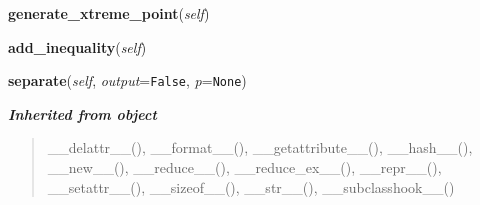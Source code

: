     \vspace{0.5ex}

\hspace{.8\funcindent}\begin{boxedminipage}{\funcwidth}

    \raggedright \textbf{generate\_xtreme\_point}(\textit{self})

\setlength{\parskip}{2ex}
\setlength{\parskip}{1ex}
    \end{boxedminipage}

    \label{coinor:cuppy:genericSeparation:GenericSeparation:add_inequality}

    \vspace{0.5ex}

\hspace{.8\funcindent}\begin{boxedminipage}{\funcwidth}

    \raggedright \textbf{add\_inequality}(\textit{self})

\setlength{\parskip}{2ex}
\setlength{\parskip}{1ex}
    \end{boxedminipage}

    \label{coinor:cuppy:genericSeparation:GenericSeparation:separate}

    \vspace{0.5ex}

\hspace{.8\funcindent}\begin{boxedminipage}{\funcwidth}

    \raggedright \textbf{separate}(\textit{self}, \textit{output}={\tt False}, \textit{p}={\tt None})

\setlength{\parskip}{2ex}
\setlength{\parskip}{1ex}
    \end{boxedminipage}


\large{\textbf{\textit{Inherited from object}}}

\begin{quote}
\_\_delattr\_\_(), \_\_format\_\_(), \_\_getattribute\_\_(), \_\_hash\_\_(), \_\_new\_\_(), \_\_reduce\_\_(), \_\_reduce\_ex\_\_(), \_\_repr\_\_(), \_\_setattr\_\_(), \_\_sizeof\_\_(), \_\_str\_\_(), \_\_subclasshook\_\_()
\end{quote}

